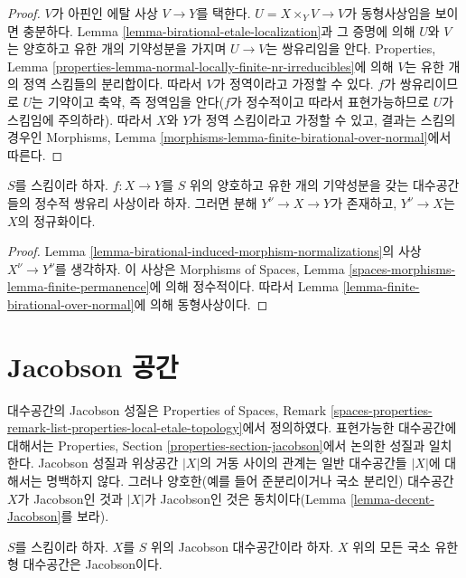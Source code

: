 \begin{proof}
$V$가 아핀인 에탈 사상 $V \to Y$를 택한다.
$U = X \times_Y V \to V$가 동형사상임을 보이면 충분하다.
Lemma \ref{lemma-birational-etale-localization}과 그 증명에 의해
$U$와 $V$는 양호하고 유한 개의 기약성분을 가지며
$U \to V$는 쌍유리임을 안다. Properties, Lemma
\ref{properties-lemma-normal-locally-finite-nr-irreducibles}에 의해
$V$는 유한 개의 정역 스킴들의 분리합이다. 따라서 $V$가 정역이라고
가정할 수 있다. $f$가 쌍유리이므로 $U$는 기약이고 축약, 즉
정역임을 안다($f$가 정수적이고 따라서 표현가능하므로 $U$가 스킴임에
주의하라). 따라서 $X$와 $Y$가 정역 스킴이라고 가정할 수 있고,
결과는 스킴의 경우인 Morphisms, Lemma
\ref{morphisms-lemma-finite-birational-over-normal}에서 따른다.
\end{proof}

\begin{lemma}
\label{lemma-normalization-normal}
$S$를 스킴이라 하자. $f : X \to Y$를 $S$ 위의 양호하고 유한 개의
기약성분을 갖는 대수공간들의 정수적 쌍유리 사상이라 하자.
그러면 분해 $Y^\nu \to X \to Y$가 존재하고,
$Y^\nu \to X$는 $X$의 정규화이다.
\end{lemma}

\begin{proof}
Lemma \ref{lemma-birational-induced-morphism-normalizations}의 사상
$X^\nu \to Y^\nu$를 생각하자. 이 사상은 Morphisms of Spaces, Lemma
\ref{spaces-morphisms-lemma-finite-permanence}에 의해 정수적이다.
따라서 Lemma \ref{lemma-finite-birational-over-normal}에 의해
동형사상이다.
\end{proof}

\section{Jacobson 공간}
\label{section-jacobson}

\noindent
대수공간의 Jacobson 성질은 Properties of Spaces, Remark
\ref{spaces-properties-remark-list-properties-local-etale-topology}에서
정의하였다. 표현가능한 대수공간에 대해서는 Properties, Section
\ref{properties-section-jacobson}에서 논의한 성질과 일치한다.
Jacobson 성질과 위상공간 $|X|$의 거동 사이의 관계는 일반 대수공간들
$|X|$에 대해서는 명백하지 않다. 그러나 양호한(예를 들어 준분리이거나
국소 분리인) 대수공간 $X$가 Jacobson인 것과 $|X|$가 Jacobson인 것은
동치이다(Lemma \ref{lemma-decent-Jacobson}를 보라).

\begin{lemma}
\label{lemma-Jacobson-universally-Jacobson}
$S$를 스킴이라 하자. $X$를 $S$ 위의 Jacobson 대수공간이라 하자.
$X$ 위의 모든 국소 유한형 대수공간은 Jacobson이다.
\end{lemma}

